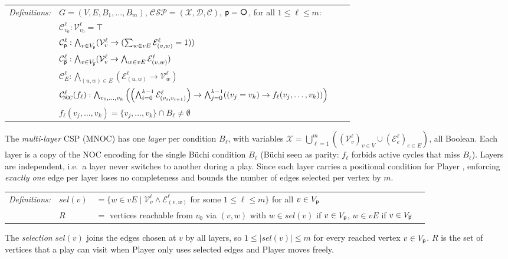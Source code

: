 \documentclass[12pt]{extarticle}
\newcommand{\definition}[1] {
    \begin{tcolorbox}[colback=mygray,colframe=mygray,sharp corners=all,top=0.01cm,bottom=0.01cm,left=0.1cm]
    \small
    \setlength{\tabcolsep}{2pt}
    \begin{tabular}{l l l l}
        \textit{Definitions:} & #1
    \end{tabular}
    \end{tcolorbox}
}
\begin{document}
\definition{
    $G=(V,E,B_1,\ldots,B_m)$, $\mathcal{CSP = (X, D, C)}$, $\player = \even$, for all $1 \leqslant \ell \leqslant m$:
    \\ & $\mathcal{C}^{\ell}_{v_0} : \mathcal{V}^{\ell}_{v_0} = \top$
    \\ & $\mathcal{C}^{\ell}_{\mathsf{p}} : \bigwedge_{v \in V_{\mathsf{p}}} (\mathcal{V}^{\ell}_v \rightarrow (\sum_{w \in vE} \mathcal{E}^{\ell}_{(v,w)}= 1))$
    \\ & $\mathcal{C}^{\ell}_{\overline{\mathsf{p}}} : \bigwedge_{v \in V_{\overline{\mathsf{p}}}} (\mathcal{V}^{\ell}_v \rightarrow \bigwedge_{w \in vE} \mathcal{E}^{\ell}_{(v,w)})$
    \\ & $\mathcal{C}^{\ell}_{\!E} : \bigwedge_{(u,w) \in E} (\mathcal{E}^{\ell}_{(u,w)} \rightarrow \mathcal{V}^{\ell}_w)$
    \\ & $\mathcal{C}^{\ell}_{\subnoc}(f_\ell) : \bigwedge_{v_0, \dots, v_k} \left( \left(\bigwedge_{i=0}^{k-1} \mathcal{E}^{\ell}_{(v_i,v_{i+1})}\right) \to \bigwedge_{j=0}^{k-1} ((v_j = v_k) \to f_\ell(v_j, \dots, v_k)) \right)$
    \\ & $f_\ell(v_j, \dots, v_k) = \{v_j, \dots, v_k\} \cap B_\ell \neq \emptyset$
}
The \textit{multi-layer} CSP (MNOC) has one \textit{layer} per condition $B_\ell$, with variables $\mathcal{X} = \bigcup_{\ell=1}^{m} \left((\mathcal{V}^{\ell}_v)_{v \in V} \cup (\mathcal{E}^{\ell}_e)_{e \in E}\right)$, all Boolean. Each layer is a copy of the NOC encoding for the single B\"uchi condition $B_\ell$ (B\"uchi seen as parity: $f_\ell$ forbids active cycles that miss $B_\ell$). Layers are independent, i.e.\ a layer never switches to another during a play. Since each layer carries a positional condition for Player \even, enforcing \textit{exactly one} edge per layer loses no completeness and bounds the number of edges selected per vertex by $m$.

\definition{
    $\textit{sel}(v)$ &$ = \{w \in vE \mid \mathcal{V}^{\ell}_v \wedge \mathcal{E}^{\ell}_{(v,w)}$ for some $1 \leqslant \ell \leqslant m\}$ for all $v \in V_{\mathsf{p}}$
    \\ & $R$ &$ = $ vertices reachable from $v_0$ via $(v,w)$ with $w \in \textit{sel}(v)$ if $v \in V_{\mathsf{p}}$, $w \in vE$ if $v \in V_{\overline{\mathsf{p}}}$
}
The \textit{selection} $\textit{sel}(v)$ joins the edges chosen at $v$ by all layers, so $1 \leqslant |\textit{sel}(v)| \leqslant m$ for every reached vertex $v \in V_{\mathsf{p}}$. $R$ is the set of vertices that a play can visit when Player \even only uses selected edges and Player \odd moves freely.
\end{document}
